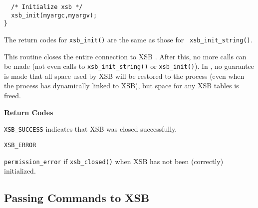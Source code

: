 \begin{description}
\begin{itemize}
\begin{verbatim}
  /* Initialize xsb */
  xsb_init(myargc,myargv);
}
    \end{verbatim}
\end{itemize}
The return codes for {\tt xsb\_init()} are the same as those for {\tt
  xsb\_init\_string()}.

 
%
This routine closes the entire connection to XSB .  After this, no
more calls can be made (not even calls to {\tt xsb\_init\_string()} or
{\tt xsb\_init()}).  In \version{}, no guarantee is made that all
space used by XSB will be restored to the process (even when the
process has dynamically linked to XSB), but space for any XSB tables
is freed.

{\bf Return Codes} 
\bi
\item {\tt XSB\_SUCCESS} indicates that XSB was closed successfully.
%
\item {\tt XSB\_ERROR} 
\bi
\item {\tt permission\_error} if {\tt xsb\_closed()} when XSB has not been
(correctly) initialized.  
\ei
%
\ei

\end{description}

\subsection{Passing Commands to XSB}

